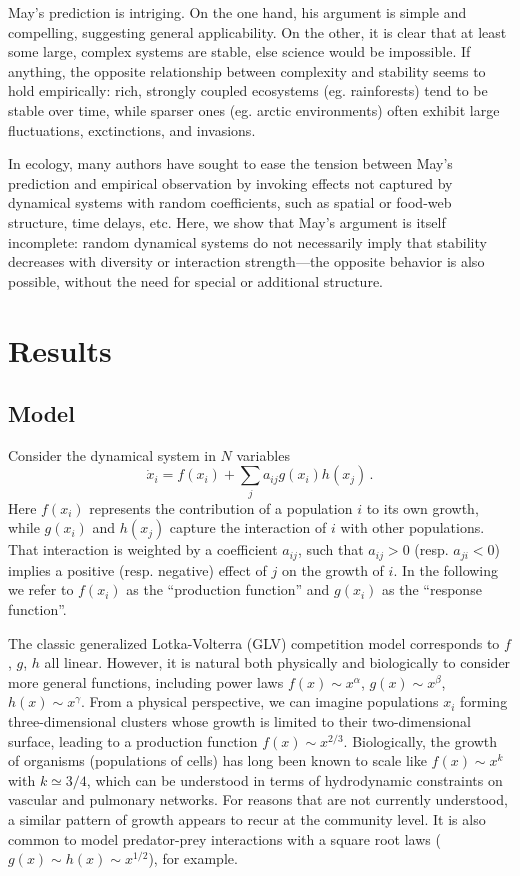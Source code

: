 \documentclass[%
 reprint,
 amsmath,amssymb,
 aps,
]{revtex4-2}
\begin{document}
May's prediction is intriging. On the one hand, his argument is simple and compelling, suggesting general applicability. 
On the other, it is clear that at least some large, complex systems are stable, else science would be impossible. 
If anything, the opposite relationship between complexity and stability seems to hold empirically: rich, strongly coupled ecosystems (eg. rainforests) tend to be  stable over time, while sparser ones (eg. arctic environments) often exhibit large fluctuations, exctinctions, and invasions. 

In ecology, many authors have sought to ease the tension between May's prediction and empirical observation by invoking effects not captured by dynamical systems with random coefficients, such as spatial or food-web structure, time delays, etc. 
Here, we show that May's argument is itself incomplete: random dynamical systems do not necessarily imply that stability decreases with diversity or interaction strength---the opposite behavior is also possible, without the need for special or additional structure. 

\section{Results}

\subsection{Model}

Consider the dynamical system in $N$ variables
\begin{equation}\label{dynamics}
    \dot{x}_i = f(x_i) + \sum_{j}a_{ij}g(x_i)h(x_j) \, .
\end{equation}
Here $f(x_i)$ represents the contribution of a population $i$ to its own growth, while $g(x_i)$ and $h(x_j)$ capture the interaction of $i$ with other populations. 
That interaction is weighted by a coefficient $a_{ij}$, such that $a_{ij} > 0$ (resp. $a_{ji} < 0$) implies a positive (resp. negative) effect of $j$ on the growth of $i$. 
In the following we refer to $f(x_i)$ as the ``production function'' and $g(x_i)$ as the ``response function''. 

The classic generalized Lotka-Volterra (GLV) competition model corresponds to $f$, $g$, $h$ all linear. 
However, it is natural both physically and biologically to consider more general functions, including power laws $f(x)\sim x^\alpha$, $g(x)\sim x^\beta$, $h(x) \sim x^\gamma$. 
From a physical perspective, we can imagine populations $x_i$ forming three-dimensional clusters whose growth is limited to their two-dimensional surface, leading to a production function $f(x) \sim x^{2/3}$. 
Biologically, the growth of organisms (populations of cells) has long been known to scale like $f(x) \sim x^k$ with $k\simeq 3/4$, which can be understood in terms of hydrodynamic constraints on vascular and pulmonary networks. 
For reasons that are not currently understood, a similar pattern of growth appears to recur at the community level. 
It is also common to model predator-prey interactions with a square root laws ($g(x) \sim h(x) \sim x^{1/2}$), for example. 
\end{document}
